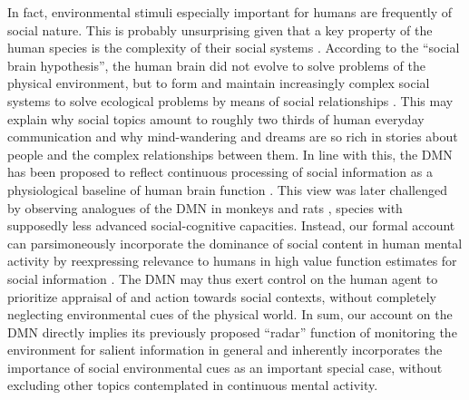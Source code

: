 \documentclass[10pt,letterpaper]{article}
\begin{document}
In fact,
environmental stimuli especially important for humans are frequently of
social nature. This is probably unsurprising
given that a key property of the human species is
the complexity of their social systems
\citep{tomasello2009cultural}.
According to the ``social brain hypothesis'',
the human brain did not evolve to solve problems of the
physical environment, but to form and maintain increasingly complex
social systems to solve ecological problems by means of social relationships
\citep{whiten1988machiavellian}.
This may explain why social topics amount to roughly
two thirds of human everyday communication \citep{dunbar1997human}
and
why mind-wandering and dreams
are so rich in stories about people and
the complex relationships between them.
%
In line with this, the DMN has been proposed to reflect
continuous processing of social information as a
physiological baseline of human brain function
\citep{schilbach2008minds}. This view was later challenged by observing
analogues of the DMN in monkeys \citep{mantini2011default}
and rats \citep{lu2012rat}, species with
supposedly less advanced social-cognitive capacities.
Instead,
our formal account can parsimoneously incorporate
the dominance of social content in
human mental activity by reexpressing relevance to humans
in high value function estimates for social information
\citep{baker2009action}.
The DMN may thus exert control on the human agent to prioritize
appraisal of and action towards social contexts,
without completely neglecting environmental cues of the physical world.
In sum,
our account on the DMN directly implies
its previously proposed ``radar'' function
of monitoring the environment for salient information
in general and inherently incorporates the importance of social environmental cues
as an important special case, without excluding other topics
contemplated in continuous mental activity.
\end{document}
